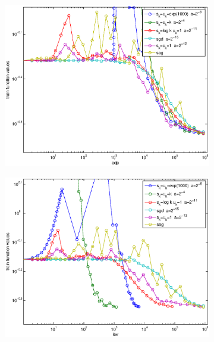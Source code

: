 \documentclass[12pt]{article}
\begin{document}
	\begin{figure}[H]
	\begin{subfigure}[b]{.5\linewidth}
		        \includegraphics[width=4in]{Figures/19-2-1.eps}
	\end{subfigure}%
	\begin{subfigure}[b]{.5\linewidth}
		        \includegraphics[width=4in]{Figures/19-2-2.eps}
	\end{subfigure}%


\end{figure}
\end{document}
